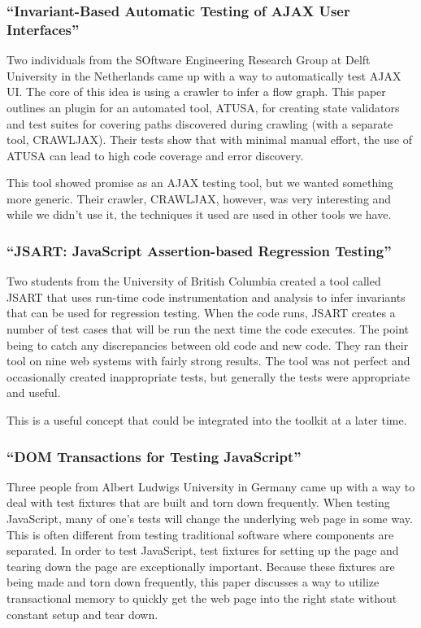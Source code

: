 \documentclass[11pt]{article}
\begin{document}
\subsubsection{``Invariant-Based Automatic Testing of AJAX User Interfaces'' \cite{InvariantBasedUseInterfaces}}
Two individuals from the SOftware Engineering Research Group at Delft University in the Netherlands came up with a way to automatically test AJAX UI. The core of this idea is using a crawler to infer a flow graph. This paper outlines an plugin for an automated tool, ATUSA, for creating state validators and test suites for covering paths discovered during crawling (with a separate tool, CRAWLJAX). Their tests show that with minimal manual effort, the use of ATUSA can lead to high code coverage and error discovery. 

This tool showed promise as an AJAX testing tool, but we wanted something more generic. Their crawler, CRAWLJAX, however, was very interesting and while we didn't use it, the techniques it used are used in other tools we have.

\subsubsection{``JSART: JavaScript Assertion-based Regression Testing'' \cite{JSART}}
Two students from the University of British Columbia created a tool called JSART that uses run-time code instrumentation and analysis to infer invariants that can be used for regression testing. When the code runs, JSART creates a number of test cases that will be run the next time the code executes. The point being to catch any discrepancies between old code and new code. They ran their tool on nine web systems with fairly strong results. The tool was not perfect and occasionally created inappropriate tests, but generally the tests were appropriate and useful.

This is a useful concept that could be integrated into the toolkit at a later time.

\subsubsection{``DOM Transactions for Testing JavaScript'' \cite{DOMTransactions}}
Three people from Albert Ludwigs University in Germany came up with a way to deal with test fixtures that are built and torn down frequently. When testing JavaScript, many of one's tests will change the underlying web page in some way. This is often different from testing traditional software where components are separated. In order to test JavaScript, test fixtures for setting up the page and tearing down the page are exceptionally important. Because these fixtures are being made and torn down frequently, this paper discusses a way to utilize transactional memory to quickly get the web page into the right state without constant setup and tear down.
\end{document}
